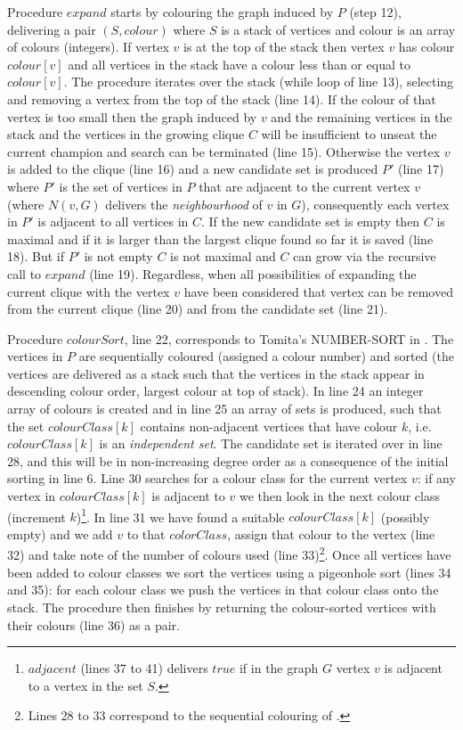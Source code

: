 \documentclass{l4proj}
\begin{document}
Procedure $expand$ starts by colouring the graph induced by $P$ (step 12), delivering a pair $(S,colour)$ where $S$ is a stack
of vertices and colour is an array of colours (integers). If vertex $v$ is at the top of the stack then vertex $v$ has colour $colour[v]$ and 
all vertices in the stack have a colour less than or equal to $colour[v]$. The procedure iterates over the stack (while loop of line 13),
selecting and removing a vertex from the top of the stack (line 14). If the colour of that vertex is too small then
the graph induced by $v$ and the remaining vertices in the stack and the vertices in the growing clique $C$
will be insufficient to unseat the current champion and search can be terminated (line 15). Otherwise the vertex $v$ is added to
the clique (line 16) and a new candidate set is produced $P'$ (line 17) where $P'$ is the set of vertices in $P$ that are
adjacent to the current vertex $v$ (where $N(v,G)$ delivers the \emph{neighbourhood} of $v$ in $G$), 
consequently each vertex in $P'$ is adjacent to all vertices in $C$. If the new candidate set is empty then $C$ is maximal
and if it is larger than the largest clique found so far it is saved (line 18). But if $P'$ is not empty $C$ is not maximal
and $C$ can grow via the recursive call to $expand$ (line 19). Regardless, when all possibilities of expanding the 
current clique with the vertex $v$ have been considered that vertex can be removed from the current clique (line 20) 
and from the candidate set (line 21).

Procedure $colourSort$, line 22, corresponds to Tomita's NUMBER-SORT in \cite{tomita2003}. The vertices in $P$ are sequentially 
coloured (assigned a 
colour number) and sorted (the vertices are delivered as a stack such that the vertices in the stack appear in
descending colour order, largest colour at top of stack). In line 24 an integer array of colours is created and in
line 25 an array of sets is produced, such that the set $colourClass[k]$ contains non-adjacent vertices that have colour $k$, i.e.
$colourClass[k]$ is an \emph{independent set}. The candidate set is iterated over in line 28, and this will be in non-increasing
degree order as a consequence of the initial sorting in line 6. Line 30 searches for a colour class for the current vertex $v$:
if any vertex in $colourClass[k]$ is adjacent to $v$ we then look in the next colour class (increment $k$)\footnote{$adjacent$ 
(lines 37 to 41) delivers $true$ if in the graph $G$  vertex $v$ is adjacent to a vertex in the set $S$.}.
In line 31 we have found a suitable $colourClass[k]$ (possibly empty) and we add $v$ to that $colorClass$, assign that colour to the vertex
(line 32) and take note of the number of colours 
used (line 33)\footnote{Lines 28 to 33 correspond to the sequential colouring of \cite{welshPowell}.}.  
Once all vertices have been added to colour classes 
we sort the vertices using a pigeonhole sort (lines 34 and 35): for each colour class we push the vertices in that
colour class onto the stack. The procedure then finishes by returning the colour-sorted vertices with their colours (line 36) as a pair.
\end{document}
